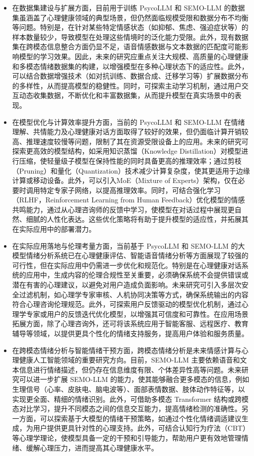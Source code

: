 \begin{itemize}
  \item 在数据集建设与扩展方面，目前用于训练 PsycoLLM 和 SEMO-LLM 的数据集虽涵盖了心理健康领域的典型场景，但仍然面临规模受限和数据分布不均衡等问题。特别是，在针对某些特定情感状态（如抑郁、焦虑、强迫症状等）的样本数量较少，导致模型在处理这些情境时的泛化能力受限。此外，现有数据集在跨模态信息整合方面仍显不足，语音情感数据与文本数据的匹配度可能影响模型的学习效果。因此，未来的研究应重点关注大规模、高质量的心理健康和多模态情绪数据集的构建，以增强模型在多种心理状态下的适应性。此外，可以结合数据增强技术（如对抗训练、数据合成、迁移学习等）扩展数据分布的多样性，从而提高模型的稳健性。同时，可探索主动学习机制，通过用户交互动态收集数据，不断优化和丰富数据集，从而提升模型在真实场景中的表现。
  \item 在模型优化与计算效率提升方面，当前的 PsycoLLM 和 SEMO-LLM 在情绪理解、共情能力及心理健康对话方面取得了较好的效果，但仍面临计算开销较高、推理速度较慢等问题，限制了其在资源受限设备上的应用。未来的研究可探索更高效的模型结构，如采用知识蒸馏（Knowledge Distillation）对模型进行压缩，使轻量级子模型在保持性能的同时具备更高的推理效率；通过剪枝（Pruning）和量化（Quantization）技术减少计算复杂度，使其更适用于边缘计算或移动设备。此外，可以引入MoE（Mixture of Experts）架构，仅在必要时调用特定专家子网络，以提高推理效率。同时，可结合强化学习（RLHF，Reinforcement Learning from Human Feedback）优化模型的情感共鸣能力，通过从心理咨询师的反馈中学习，使模型在对话过程中展现更自然、细腻的人性化表达。这些优化策略将有助于提升模型的适应性，并拓展其在实际应用中的部署潜力。
  \item 在实际应用落地与伦理考量方面，当前基于 PsycoLLM 和 SEMO-LLM 的大模型情绪分析系统已在心理健康评估、智能语音情绪分析等方面展现了较强的可行性，但在实际应用中仍需进一步优化和规范化。特别是在心理健康对话系统的应用中，生成内容的伦理合规性至关重要，必须确保系统不会提供错误或潜在有害的心理建议，以避免对用户造成负面影响。未来研究可引入多层次安全过滤机制，如心理学专家审核、人机协同决策等方式，确保系统输出的内容符合心理咨询伦理规范。此外，可探索用户反馈驱动的模型优化机制，通过心理学专家或用户的反馈迭代优化模型，以增强其可信度和可靠性。在应用场景拓展方面，除了心理咨询外，还可将该系统应用于智能客服、远程医疗、教育辅导等领域，以提供更具个性化的情绪支持服务，提高用户体验和服务质量。
  \item 在跨模态情绪分析与智能情绪干预方面，跨模态情绪分析是未来情感计算与心理健康人工智能领域的重要研究方向。目前，SEMO-LLM 主要依赖语音和文本信息进行情绪描述，但仍存在信息维度有限、个体差异性高等问题。未来研究可以进一步扩展 SEMO-LLM 的能力，使其能够融合更多模态的信息，例如生理信号（心率、皮肤电、脑电波等）、面部表情数据、肢体动作特征等，以实现更全面、精细的情绪识别。此外，可借助多模态 Transformer 结构或跨模态对比学习，提升不同模态之间的信息交互能力，提高情绪检测的准确性。另一方面，可以探索基于大模型的情绪干预策略，如通过个性化情绪调适建议生成，为用户提供更具针对性的心理支持。此外，可结合认知行为疗法（CBT）等心理学理论，使模型具备一定的干预和引导能力，帮助用户更有效地管理情绪、缓解心理压力，进而提高其心理健康水平。
\end{itemize}
